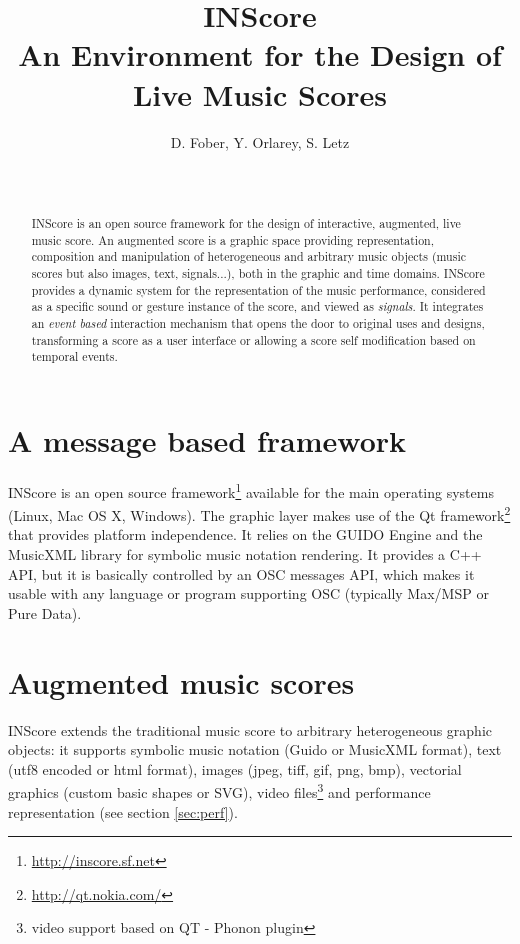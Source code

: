 \documentclass{nime-workshop}
\begin{document}
\title{INScore \\
{\Large \textbf{An Environment for the Design of Live Music Scores}}
}

\author{
D. Fober, Y. Orlarey, S. Letz\\
\\
 \\
}
\date{}

\maketitle



\begin{abstract}
INScore is an open source framework for the design of interactive, augmented, live music score. An augmented score is a graphic space providing representation, composition and manipulation of heterogeneous and arbitrary music objects (music scores but also images, text, signals...), both in the graphic and time domains. 
INScore provides a dynamic system for the representation of the music performance, considered as a specific sound or gesture instance of the score, and viewed as \emph{signals}. 
It integrates an \emph{event based} interaction mechanism that opens the door to original uses and designs, transforming a score as a user interface or allowing a score self modification based on temporal events.
\end{abstract}
%

\section{A message based framework}\label{sec:msg}
INScore is an open source framework\footnote{\url{http://inscore.sf.net}} available for the main operating systems (Linux, Mac OS X, Windows). The graphic layer makes use of the Qt framework\footnote{\url{http://qt.nokia.com/}} that provides platform independence. It relies on the GUIDO Engine and the MusicXML library for symbolic music notation rendering. It provides a C++ API, but it is basically controlled by an OSC messages API, which makes it usable with any language or program supporting OSC (typically Max/MSP or Pure Data). 

\section{Augmented music scores}\label{sec:ams}
INScore extends the traditional music score to arbitrary heterogeneous graphic objects: it supports symbolic music notation (Guido or MusicXML format), text (utf8 encoded or html format), images (jpeg, tiff, gif, png, bmp), vectorial graphics (custom basic shapes or SVG), video files\footnote{video support based on QT - Phonon plugin} and performance representation (see section \ref{sec:perf}).
\end{document}

